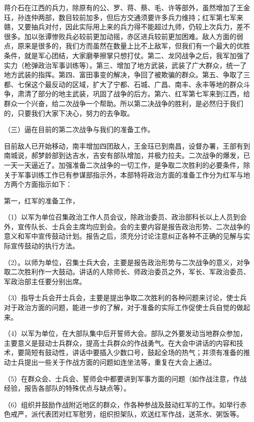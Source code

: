 蒋介石在江西的兵力，除原有的公、罗、蒋、蔡、毛、许等部外，虽然增加了王金珏，孙连仲两部，数目较前加多，但后方交通须要许多兵力维持；红军第七军来赣，又要抽兵对付，因此实际用上来的兵力得不能超过九师，仍较上次兵力，差不很多。加以张谭惨败兵必较前更加动摇，赤区进兵较前更加困难。敌人方面的弱点，原来是很多的，我们方而虽然在数量上比不上敌军，但我们有一个最大的优胜条件，就是军心团结，大家磨拳擦掌只想打仗。第二、龙冈战争之后，我军加强了实力（枪弹政治军事训练等）。第三、增加了地方武装，武装了广大群众，统一了地方武装的指挥。第四、富田事变的解决，争回了被欺骗的群众。第五、争取了三都、七保这个最反动的区域，扩大了宁都、石城、广昌、南丰、永丰等地的群众斗争，肃清了部分的地主武装，巩固了战争的后方。第六、红军第七军来到江西，给群众一个兴奋，给二次战争一个帮助。所以第二决战争的胜利，是必然归于我们的，只要我们大家下决心，努力的去争取。

（三）逼在目前的第二次战争与我们的准备工作。

目前敌人已开始移动，南丰增加四团敌人，王金珏已到南昌，设督办署，王部有到南城说，郝梦龄部到达吉水，吉安有部队增加，并极力拉夫。二次战争的爆发，已一天一天逼近了。加强准备二次战争的一切工作，是争取二次胜利的必要条件，除关于军事训练工作已有参谋部指示外，本部特将政治方面的准备工作分为红军与地方两个方面指示如下：

第一，红军的准备工作，

（1）以军为单位召集政治工作人员会议，除政治委员、政治部科长以上人员到会外，宣传队长、士兵会主席均应到会。会的主要内容是报告政治形势、二次战争的意义和军中宣传鼓动计划。报告之后，须充分讨论注意纠正各种不正确的见解与实际宣传鼓动的执行方法。

（2）。以师为单位，召集士兵大会，主要是报告政治形势与二次战争的意义，对争取二次胜利作一大鼓动。讲话的人除师长、师政治委员之外，军长、军政治委员、军政治部主任要分别出席。

（3）指导士兵会开士兵会，主要是提出争取二次胜利的各种问题来讨论，使士兵对于政治方面的问题，能进一步的了解，对于准备的实际工作促使士兵自觉的做起来。

（4）以军为单位，在大部队集中后开誓师大会。部队之外要发动当地群众参加，主要意义是鼓动士兵群众，提高士兵群众的作战勇气。在大会中讲话的内容和技术，要简短有鼓动性，讲话中要插入少数口号，鼓起全场的热气；并须有准备的推动士兵提出一些关于作战方面的问题如连坐法等，重复在大会上通过。

（5）在群众会、士兵会、誓师会中都要讲到军事方面的问题（如作战注意，作战经验，报告各部队的特殊优点与缺点等）。

（6）组织并鼓励作战附近地区的群众，作各种参战及鼓动红军的工作。如举行赤色戒严，派代表团对红军慰劳，组织担架队，欢送红军作战，送茶水、粥饭等。

